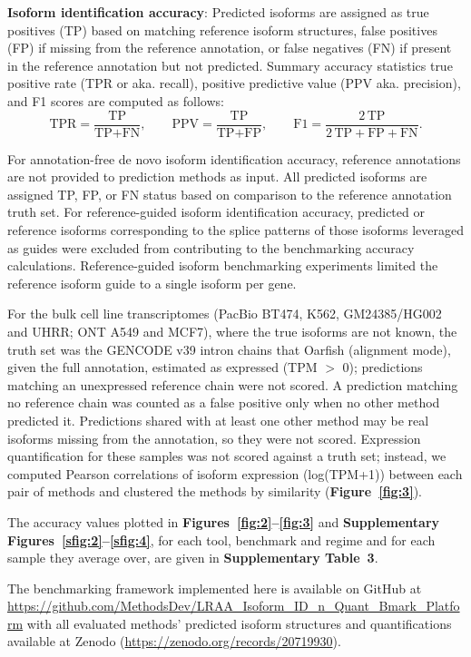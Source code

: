 \textbf{Isoform identification accuracy}: Predicted isoforms are assigned as true positives (TP) based on matching reference isoform structures, false positives (FP) if missing from the reference annotation, or false negatives (FN) if present in the reference annotation but not predicted. Summary accuracy statistics true positive rate (TPR or aka. recall), positive predictive value (PPV aka. precision), and F1 scores are computed as follows:
\[\text{TPR} = \frac{\text{TP}}{\text{TP} + \text{FN}}, \qquad
\text{PPV} = \frac{\text{TP}}{\text{TP} + \text{FP}}, \qquad
\text{F1} = \frac{2\,\text{TP}}{2\,\text{TP} + \text{FP} + \text{FN}}.\]

For annotation-free de novo isoform identification accuracy, reference annotations are not provided to prediction methods as input. All predicted isoforms are assigned TP, FP, or FN status based on comparison to the reference annotation truth set. For reference-guided isoform identification accuracy, predicted or reference isoforms corresponding to the splice patterns of those isoforms leveraged as guides were excluded from contributing to the benchmarking accuracy calculations. Reference-guided isoform benchmarking experiments limited the reference isoform guide to a single isoform per gene.

For the bulk cell line transcriptomes (PacBio BT474, K562, GM24385/HG002 and UHRR; ONT A549 and MCF7), where the true isoforms are not known, the truth set was the GENCODE v39 intron chains that Oarfish (alignment mode), given the full annotation, estimated as expressed (TPM $>$ 0); predictions matching an unexpressed reference chain were not scored. A prediction matching no reference chain was counted as a false positive only when no other method predicted it. Predictions shared with at least one other method may be real isoforms missing from the annotation, so they were not scored. Expression quantification for these samples was not scored against a truth set; instead, we computed Pearson correlations of isoform expression (log(TPM+1)) between each pair of methods and clustered the methods by similarity (\textbf{Figure~\ref{fig:3}}).

The accuracy values plotted in \textbf{Figures~\ref{fig:2}--\ref{fig:3}} and \textbf{Supplementary Figures~\ref{sfig:2}--\ref{sfig:4}}, for each tool, benchmark and regime and for each sample they average over, are given in \textbf{Supplementary Table~3}.

The benchmarking framework implemented here is available on GitHub at \url{https://github.com/MethodsDev/LRAA_Isoform_ID_n_Quant_Bmark_Platform} with all evaluated methods' predicted isoform structures and quantifications available at Zenodo (\url{https://zenodo.org/records/20719930}).


